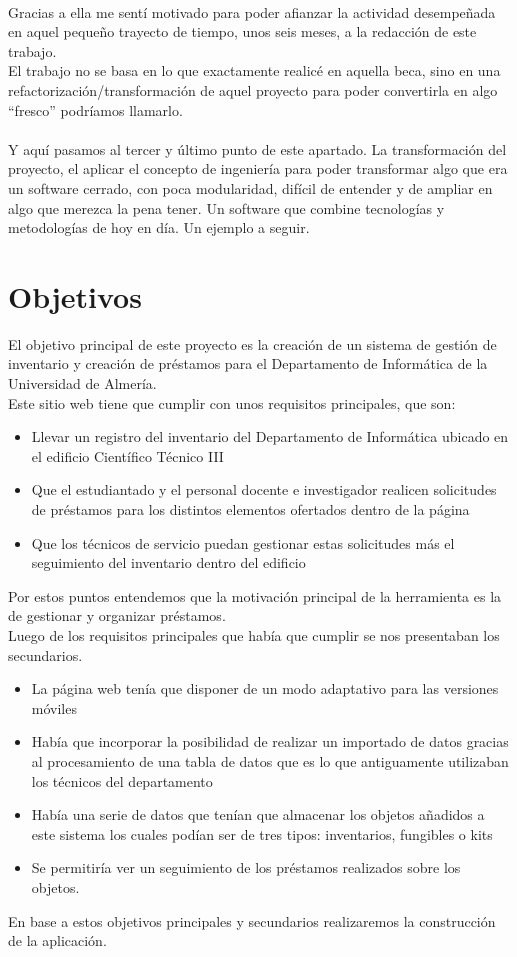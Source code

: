 \\Gracias a ella me sentí motivado para poder afianzar la actividad desempeñada en aquel pequeño trayecto de tiempo, unos seis meses, a la redacción de este trabajo.
\\El trabajo no se basa en lo que exactamente realicé en aquella beca, sino en una refactorización/transformación de aquel proyecto para poder convertirla en algo ``fresco'' podríamos llamarlo.
\\\\Y aquí pasamos al tercer y último punto de este apartado. La transformación del proyecto, el aplicar el concepto de ingeniería para poder transformar algo que era un software cerrado, con poca modularidad, difícil de entender y de ampliar en algo que merezca la pena tener. Un software que combine tecnologías y metodologías de hoy en día. Un ejemplo a seguir.

\section{Objetivos}

El objetivo principal de este proyecto es la creación de un sistema de gestión de inventario y creación de préstamos para el Departamento de Informática de la Universidad de Almería.
\\Este sitio web tiene que cumplir con unos requisitos principales, que son:

\begin{itemize}
    \item Llevar un registro del inventario del Departamento de Informática ubicado en el edificio Científico Técnico III
    \item Que el estudiantado y el personal docente e investigador realicen solicitudes de préstamos para los distintos elementos ofertados dentro de la página
    \item Que los técnicos de servicio puedan gestionar estas solicitudes más el seguimiento del inventario dentro del edificio
\end{itemize}
Por estos puntos entendemos que la motivación principal de la herramienta es la de gestionar y organizar préstamos.
\\Luego de los requisitos principales que había que cumplir se nos presentaban los secundarios.

\begin{itemize}
    \item La página web tenía que disponer de un modo adaptativo para las versiones móviles
    \item Había que incorporar la posibilidad de realizar un importado de datos gracias al procesamiento de una tabla de datos que es lo que antiguamente utilizaban los técnicos del departamento
    \item Había una serie de datos que tenían que almacenar los objetos añadidos a este sistema los cuales podían ser de tres tipos: inventarios, fungibles o kits
    \item Se permitiría ver un seguimiento de los préstamos realizados sobre los objetos.
\end{itemize}
En base a estos objetivos principales y secundarios realizaremos la construcción de la aplicación.

